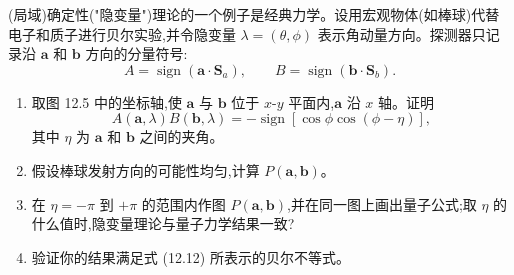 \begin{question}
(局域)确定性("隐变量")理论的一个例子是经典力学。设用宏观物体(如棒球)代替电子和质子进行贝尔实验,并令隐变量 $\lambda=(\theta,\phi)$ 表示角动量方向。探测器只记录沿 $\mathbf a$ 和 $\mathbf b$ 方向的分量符号:
\[
A=\operatorname{sign}(\mathbf a\cdot\mathbf S_a),\qquad B=\operatorname{sign}(\mathbf b\cdot\mathbf S_b).
\]
\begin{enumerate}
\item 取图 12.5 中的坐标轴,使 $\mathbf a$ 与 $\mathbf b$ 位于 $x$-$y$ 平面内,$\mathbf a$ 沿 $x$ 轴。证明
\[
A(\mathbf a,\lambda)B(\mathbf b,\lambda)=-\operatorname{sign}[\cos\phi\cos(\phi-\eta)],
\]
其中 $\eta$ 为 $\mathbf a$ 和 $\mathbf b$ 之间的夹角。
\item 假设棒球发射方向的可能性均匀,计算 $P(\mathbf a,\mathbf b)$。
\item 在 $\eta=-\pi$ 到 $+\pi$ 的范围内作图 $P(\mathbf a,\mathbf b)$,并在同一图上画出量子公式;取 $\eta$ 的什么值时,隐变量理论与量子力学结果一致?
\item 验证你的结果满足式 (12.12) 所表示的贝尔不等式。
\end{enumerate}

\par\smallskip
{}

\end{question}
